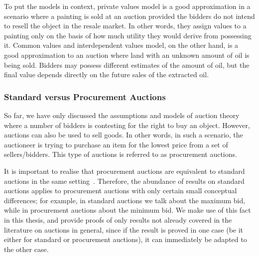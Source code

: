 To put the models in context, private values model is a good approximation in a scenario where a painting is sold at an auction provided the bidders do not intend to resell the object in the resale market. In other words, they assign values to a painting only on the basis of how much utility they would derive from possessing it. Common values and interdependent values model, on the other hand, is a good approximation to an auction where land with an unknown amount of oil is being sold. Bidders may possess different estimates of the amount of oil, but the final value depends directly on the future sales of the extracted oil.

\subsubsection{Standard versus Procurement Auctions} %
\label{ssub:standard_versus_procurement_auctions_dmp}
So far, we have only discussed the assumptions and models of auction theory where a number of bidders is contesting for the right to buy an object. However, auctions can also be used to sell goods. In other words, in such a scenario, the auctioneer is trying to purchase an item for the lowest price from a set of sellers/bidders. This type of auctions is referred to as procurement auctions.

It is important to realise that procurement auctions are equivalent to standard auctions in the same setting~\cite{Krishna10}. Therefore, the abundance of results on standard auctions applies to procurement auctions with only certain small conceptual differences; for example, in standard auctions we talk about the maximum bid, while in procurement auctions about the minimum bid. We make use of this fact in this thesis, and provide proofs of only results not already covered in the literature on auctions in general, since if the result is proved in one case (be it either for standard or procurement auctions), it can immediately be adapted to the other case.

